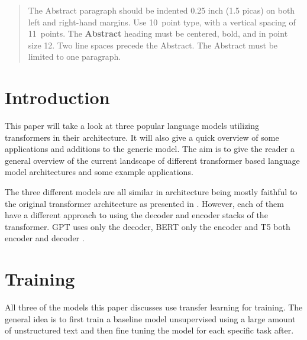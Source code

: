 \documentclass[twoside]{article}
\begin{document}
%

%


\begin{abstract}
  The Abstract paragraph should be indented 0.25 inch (1.5 picas) on
  both left and right-hand margins. Use 10~point type, with a vertical
  spacing of 11~points.  The {\bf Abstract} heading must be centered,
  bold, and in point size 12. Two line spaces precede the
  Abstract. The Abstract must be limited to one paragraph.
\end{abstract}

\section{Introduction}
This paper will take a look at three popular language models utilizing
transformers in their architecture. It will also give a quick overview
of some applications and additions to the generic model. The aim is to
give the reader a general overview of the current landscape of different
transformer based language model architectures and some example applications.

The three different models are all similar in architecture being mostly
faithful to the original transformer architecture as presented in 
\cite{vaswani_attention_2017}. However, each of them have a different approach
to using the decoder and encoder stacks of the transformer. GPT uses only
the decoder, BERT only the encoder and T5 both encoder and decoder
\cite{radford_improving_nodate,devlin_bert_2019,raffel_exploring_2020}.

\section{Training}
All three of the models this paper discusses use transfer learning for 
training. The general idea is to first train a baseline model unsupervised 
using a large amount of unstructured text and then fine tuning the model
for each specific task after. 
\end{document}
